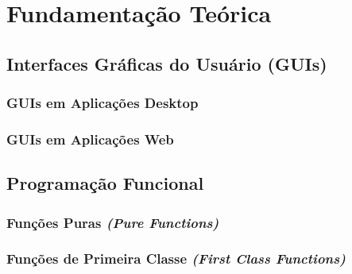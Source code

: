 \section{Fundamentação Teórica}
\label{sec:fund-teor}

\subsection{Interfaces Gráficas do Usuário (GUIs)}
\label{sec:guis}

\subsubsection{GUIs em Aplicações Desktop}
\label{sec:guis-desktop}


\subsubsection{GUIs em Aplicações Web}
\label{sec:guis-web}

%
%

\subsection{Programação Funcional}
\label{sec:prog-funcional}



\subsubsection{Funções Puras \emph{(Pure Functions)}}
\label{sec:func-puras}



\subsubsection{Funções de Primeira Classe \emph{(First Class Functions)}}

